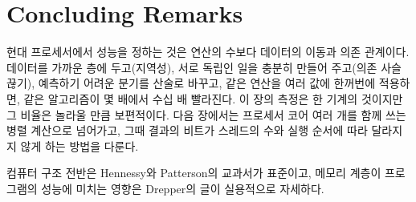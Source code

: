 \section{Concluding Remarks}

현대 프로세서에서 성능을 정하는 것은 연산의 수보다 데이터의 이동과 의존 관계이다. 데이터를 가까운 층에 두고(지역성), 서로 독립인 일을 충분히 만들어 주고(의존 사슬 끊기), 예측하기 어려운 분기를 산술로 바꾸고, 같은 연산을 여러 값에 한꺼번에 적용하면, 같은 알고리즘이 몇 배에서 수십 배 빨라진다. 이 장의 측정은 한 기계의 것이지만 그 비율은 놀라울 만큼 보편적이다. 다음 장에서는 프로세서 코어 여러 개를 함께 쓰는 병렬 계산으로 넘어가고, 그때 결과의 비트가 스레드의 수와 실행 순서에 따라 달라지지 않게 하는 방법을 다룬다.

컴퓨터 구조 전반은 Hennessy와 Patterson의 교과서\cite{hennessy2019}가 표준이고, 메모리 계층이 프로그램의 성능에 미치는 영향은 Drepper의 글\cite{drepper2007}이 실용적으로 자세하다.

\chapterreferences
